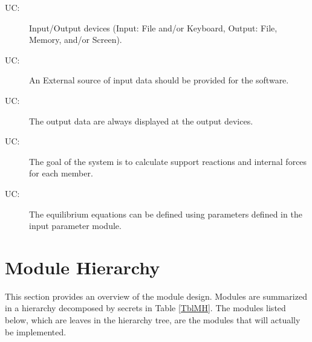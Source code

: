 \documentclass[12pt, titlepage]{article}
\newcounter{ucnum}
\newcommand{\uctheucnum}{UC\theucnum}
\begin{document}
\begin{description}
\item[ \uctheucnum \label{ucIO}:] Input/Output devices
  (Input: File and/or Keyboard, Output: File, Memory, and/or Screen).
  \item[ \uctheucnum \label{ucExternalIn}:] 
  An External source of input data should be provided for the software.
  \item[ \uctheucnum \label{ucDispaly}:] The output data are always displayed at the output devices.
  \item[ \uctheucnum \label{ucGoal}:] The goal of the system is to calculate support reactions and internal forces for each member.
  \item[ \uctheucnum \label{ucGoal}:] The equilibrium equations can be defined using parameters defined in the input parameter module. 

\end{description}

\section{Module Hierarchy} \label{SecMH}

This section provides an overview of the module design. Modules are summarized
in a hierarchy decomposed by secrets in Table \ref{TblMH}. The modules listed
below, which are leaves in the hierarchy tree, are the modules that will
actually be implemented.
\end{document}
